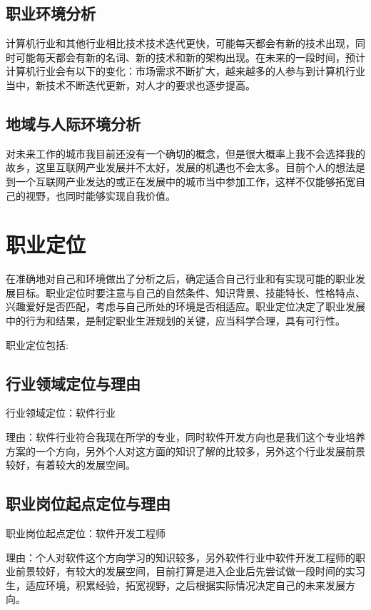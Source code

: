 \documentclass{article}
\begin{document}
\subsection{职业环境分析}
计算机行业和其他行业相比技术技术迭代更快，可能每天都会有新的技术出现，同时可能每天都会有新的名词、新的技术和新的架构出现。在未来的一段时间，预计计算机行业会有以下的变化：市场需求不断扩大，越来越多的人参与到计算机行业当中，新技术不断迭代更新，对人才的要求也逐步提高。
\par

\subsection{地域与人际环境分析}
对未来工作的城市我目前还没有一个确切的概念，但是很大概率上我不会选择我的故乡，这里互联网产业发展并不太好，发展的机遇也不会太多。目前个人的想法是到一个互联网产业发达的或正在发展中的城市当中参加工作，这样不仅能够拓宽自己的视野，也同时能够实现自我价值。



\section{职业定位}
在准确地对自己和环境做出了分析之后，确定适合自己行业和有实现可能的职业发展目标。职业定位时要注意与自己的自然条件、知识背景、技能特长、性格特点、兴趣爱好是否匹配，考虑与自己所处的环境是否相适应。职业定位决定了职业发展中的行为和结果，是制定职业生涯规划的关键，应当科学合理，具有可行性。\par
职业定位包括:\par

\subsection{行业领域定位与理由}
行业领域定位：软件行业
\par
理由：软件行业符合我现在所学的专业，同时软件开发方向也是我们这个专业培养方案的一个方向，另外个人对这方面的知识了解的比较多，另外这个行业发展前景较好，有着较大的发展空间。
\par
\subsection{职业岗位起点定位与理由}
职业岗位起点定位：软件开发工程师
\par
理由：个人对软件这个方向学习的知识较多，另外软件行业中软件开发工程师的职业前景较好，有较大的发展空间，目前打算是进入企业后先尝试做一段时间的实习生，适应环境，积累经验，拓宽视野，之后根据实际情况决定自己的未来发展方向。
\par
\end{document}
